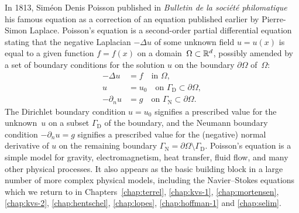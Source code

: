 In 1813, Sim\'eon Denis Poisson published in \emph{Bulletin de la
soci\'et\'e philomatique} his famous equation as a correction of
an equation published earlier by Pierre-Simon Laplace. Poisson's
equation is a second-order partial differential equation stating that
the negative Laplacian $-\Delta u$ of some unknown field $u = u(x)$ is
equal to a given function $f = f(x)$ on a domain~$\Omega \subset \mathbb{R}^d$,
possibly amended by a set of boundary conditions for the solution $u$
on the boundary $\partial \Omega$ of~$\Omega$:
\begin{equation} \label{eq:poisson}
  \begin{split}
    - \Delta u &= f \quad \mbox{in } \Omega,
    \\
    u &= u_0 \quad \mbox{on } \Gamma_{\mathrm{D}} \subset \partial \Omega,
    \\
    - \partial_n u &= g \quad \mbox{on } \Gamma_{\mathrm{N}} \subset \partial \Omega.
  \end{split}
\end{equation}
The Dirichlet boundary condition $u = u_0$ signifies a prescribed
value for the unknown~$u$ on a subset $\Gamma_{\mathrm{D}}$ of the
boundary, and the Neumann boundary condition $-\partial_n u = g$
signifies a prescribed value for the (negative) normal derivative of
$u$ on the remaining boundary $\Gamma_{\mathrm{N}} = \partial \Omega
\setminus \Gamma_{\mathrm{D}}$. Poisson's equation is a simple model
for gravity, electromagnetism, heat transfer, fluid flow, and many
other physical processes. It also appears as the basic building block
in a large number of more complex physical models, including the
Navier--Stokes equations which we return to in
Chapters~\ref{chap:terrel}, \ref{chap:kvs-1},
\ref{chap:mortensen},
\ref{chap:kvs-2}, \ref{chap:hentschel}, \ref{chap:lopes},
 \ref{chap:hoffman-1} and \ref{chap:selim}.


